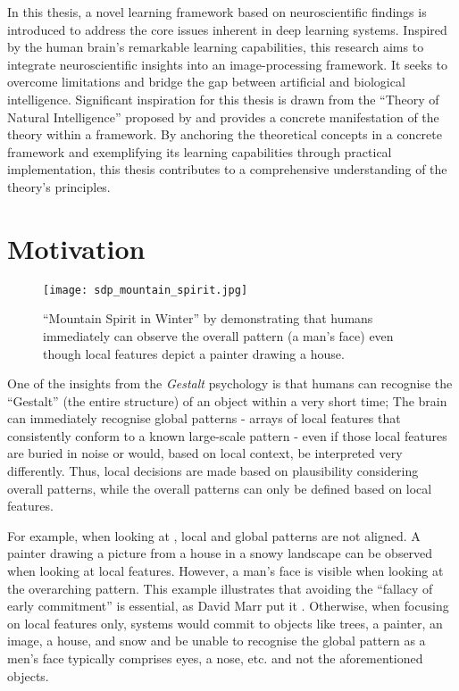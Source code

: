 In this thesis, a novel learning framework based on neuroscientific findings is introduced to address the core issues inherent in deep learning systems. Inspired by the human brain's remarkable learning capabilities, this research aims to integrate neuroscientific insights into an image-processing framework. It seeks to overcome limitations and bridge the gap between artificial and biological intelligence. Significant inspiration for this thesis is drawn from the ``Theory of Natural Intelligence'' proposed by  and provides a concrete manifestation of the theory within a framework. By anchoring the theoretical concepts in a concrete framework and exemplifying its learning capabilities through practical implementation, this thesis contributes to a comprehensive understanding of the theory's principles.

\section{Motivation}
\begin{figure}[h]
    \centering
    \texttt{[image: sdp\_mountain\_spirit.jpg]}
    \caption[``Mountain Spirit in Winter'' by Sandro del Prete]{``Mountain Spirit in Winter'' by  demonstrating that humans immediately can observe the overall pattern (a man's face) even though local features depict a painter drawing a house.}
\end{figure}

One of the insights from the \emph{Gestalt} psychology  is that humans can recognise the ``Gestalt'' (the entire structure) of an object within a very short time; The brain can immediately recognise global patterns - arrays of local features that consistently conform to a known large-scale pattern - even if those local features are buried in noise or would, based on local context, be interpreted very differently. Thus, local decisions are made based on plausibility considering overall patterns, while the overall patterns can only be defined based on local features.

For example, when looking at , local and global patterns are not aligned. A painter drawing a picture from a house in a snowy landscape can be observed when looking at local features. However, a man's face is visible when looking at the overarching pattern.
This example illustrates that avoiding the ``fallacy of early commitment'' is essential, as David Marr put it .
Otherwise, when focusing on local features only, systems would commit to objects like trees, a painter, an image, a house, and snow and be unable to recognise the global pattern as a men's face typically comprises eyes, a nose, etc. and not the aforementioned objects.

